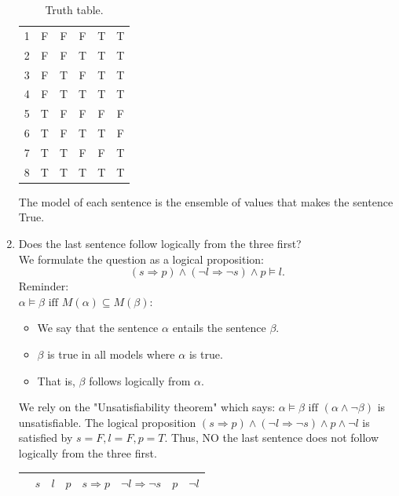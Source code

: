 \documentclass[9pt,a4paper]{extarticle}
\newenvironment{solution}
    {%
    \color{red}
    }
    { 
    \color{black}
    }
\begin{document}
\begin{enumerate}
\begin{solution}
\begin{table}[H]
\begin{tabular}{|l|ccc|cc|}
             1 & F & F & F & T & T \\
             2 & F & F & T & T & T \\
             3 & F & T & F & T & T \\
             4 & F & T & T & T & T \\
             5 & T & F & F & F & F \\
             6 & T & F & T & T & F \\
             7 & T & T & F & F & T \\
             8 & T & T & T & T & T \\  \hline
             
         \end{tabular}
         \caption{Truth table.}
         \label{tab:my_label}
     \end{table}
     The model of each sentence is the ensemble of values that makes the sentence True.
     \end{solution}
     \item Does the last sentence follow logically from the three first?
     \begin{solution}\\
     We formulate the question as a logical proposition:
     $$(s\Rightarrow p) \land (\lnot l \Rightarrow \lnot s) \land p \models l.$$ Reminder: \\
     $\alpha \models \beta \text{ iff } M(\alpha) \subseteq M(\beta) $:
     \begin{itemize}
         \item We say that the sentence $\alpha$ entails  the sentence $\beta$.
         \item $\beta$ is true in all models where $\alpha$ is true.
         \item That is, $\beta$ follows logically from $\alpha$.
     \end{itemize}
     We rely on the "Unsatisfiability theorem" which says: $\alpha \models \beta \text{ iff } (\alpha \land \lnot \beta)$ is unsatisfiable. The logical proposition $(s\Rightarrow p) \land (\lnot l \Rightarrow \lnot s) \land p \land  \lnot l$ is satisfied by $s=F, l=F, p=T$. Thus, NO the last sentence does not follow logically from the three first.
     \begin{table}[H]
         \centering
         \begin{tabular}{|l|ccc|cccc|}
          \hline
             & $s$ & $l$ & $p$ & $s \Rightarrow p$ & $\lnot l \Rightarrow \lnot s$ & $p$ & $\lnot l$\\  \hline

\end{tabular}
\end{table}
\end{solution}
\end{enumerate}
\end{document}
